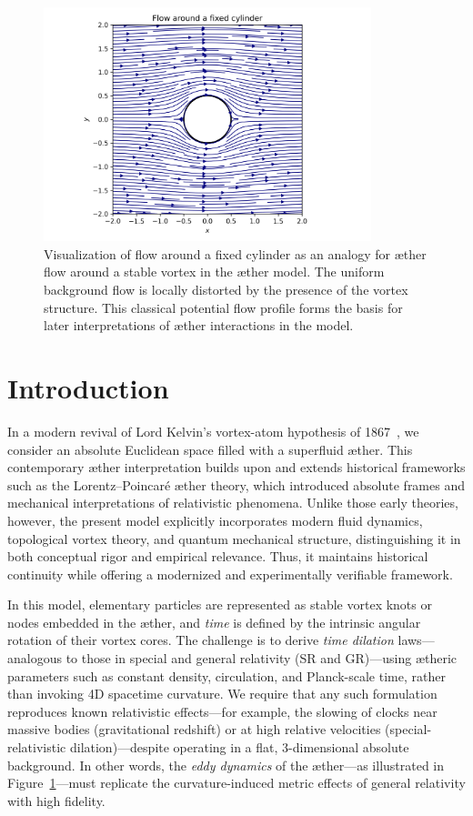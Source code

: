 \begin{figure}[htbp]
    \centering
    \includegraphics[width=0.85\textwidth]{02_cylinder_flow}
    \caption{Visualization of flow around a fixed cylinder as an analogy for æther flow around a stable vortex in the æther model. The uniform background flow is locally distorted by the presence of the vortex structure. This classical potential flow profile forms the basis for later interpretations of æther interactions in the model.}
    \label{fig:cylinderflow}
\end{figure}

\section{Introduction}
In a modern revival of Lord Kelvin's vortex-atom hypothesis of 1867~\cite{Kelvin1867-vortex}, we consider an absolute Euclidean space filled with a superfluid æther. This contemporary æther interpretation builds upon and extends historical frameworks such as the Lorentz–Poincaré æther theory, which introduced absolute frames and mechanical interpretations of relativistic phenomena. Unlike those early theories, however, the present model explicitly incorporates modern fluid dynamics, topological vortex theory, and quantum mechanical structure, distinguishing it in both conceptual rigor and empirical relevance. Thus, it maintains historical continuity while offering a modernized and experimentally verifiable framework.

In this model, elementary particles are represented as stable vortex knots or nodes embedded in the æther, and \emph{time} is defined by the intrinsic angular rotation of their vortex cores. The challenge is to derive \emph{time dilation} laws—analogous to those in special and general relativity (SR and GR)—using ætheric parameters such as constant density, circulation, and Planck-scale time, rather than invoking 4D spacetime curvature. We require that any such formulation reproduces known relativistic effects—for example, the slowing of clocks near massive bodies (gravitational redshift) or at high relative velocities (special-relativistic dilation)—despite operating in a flat, 3-dimensional absolute background. In other words, the \emph{eddy dynamics} of the æther—as illustrated in Figure~\ref{fig:cylinderflow}—must replicate the curvature-induced metric effects of general relativity with high fidelity.

